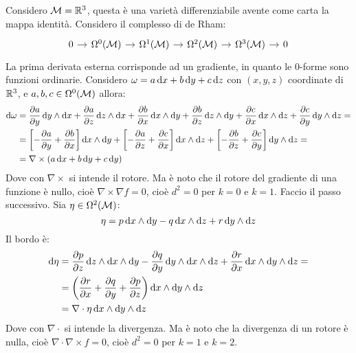 \begin{example}
  Considero $ \mathcal{M} = \mathbb{R}^{3} $, questa è una varietà differenziabile avente come
  carta la mappa identità. Considero il complesso di de Rham:
  \[
    \begin{tikzcd}[nodes = {column sep = 10 pt}]
      0 \rar & \Omega^0(\M) \rar & \Omega^1(\M) \rar & \Omega^2(\M) \rar & \Omega^3(\M) \rar & 0
    \end{tikzcd}
  \]
  La prima derivata esterna corrisponde ad un gradiente, in quanto le
  $ 0 $-forme sono funzioni ordinarie. Considero
  $ \omega = a \operatorname{d}\!{x} + b \operatorname{d}\!{y} + c \operatorname{d}\!{z} $ con $ (x,y,z) $ coordinate di
  $ \mathbb{R}^{3} $, e $ a, b, c \in \Omega^0(\mathcal{M}) $ allora:
  \begin{align*}
    \d \omega & =          \frac{\partial a}{\partial y} \d y \wedge \d x + \frac{\partial a}{\partial z} \d z \wedge \d x + \frac{\partial b}{\partial x} \d x \wedge \d y +
             \frac{\partial b}{\partial z} \d z \wedge \d y + \frac{\partial c}{\partial x} \d x \wedge \d z + \frac{\partial c}{\partial y} \d y \wedge \d z = \\
         & =      \left[ - \frac{\partial a}{\partial y} + \frac{\partial b}{\partial x} \right] \d x \wedge \d y +
                 \left[ - \frac{\partial a}{\partial z} + \frac{\partial c}{\partial x} \right] \d x \wedge \d z +
                 \left[ - \frac{\partial b}{\partial z} + \frac{\partial c}{\partial y} \right] \d y \wedge \d z =                      \\
         & =  \nabla \times (a \d x + b \d y + c \d y)
  \end{align*}
  Dove con $ \nabla \times $ si intende il rotore. Ma è noto che il rotore del gradiente di una funzione è nullo,
  cioè $ \nabla \times \nabla f = 0 $, cioè $ d^2 = 0 $ per $ k = 0 $ e $ k = 1 $.
  Faccio il passo successivo. Sia $ \eta \in \Omega^2(\mathcal{M}) $:
  \[
    \eta = p \operatorname{d}\!{x} \wedge \operatorname{d}\!{y} - q \operatorname{d}\!{x} \wedge \operatorname{d}\!{z} + r \operatorname{d}\!{y} \wedge \operatorname{d}\!{z}
  \]
  Il bordo è:
  \begin{align*}
    \d \eta & = \frac{\partial p}{\partial z} \d z \wedge \d x \wedge \d y - \frac{\partial q}{\partial y} \d y \wedge \d x \wedge \d z + \frac{\partial r}{\partial x} \d x \wedge \d y \wedge \d z = \\
    & = \left( \frac{\partial r}{\partial x} + \frac{\partial q}{\partial y} + \frac{\partial p}{\partial z} \right) \d x \wedge \d y \wedge \d z\\
    & = \nabla \cdot \eta \d x \wedge \d y \wedge \d z
  \end{align*}
  Dove con $ \nabla \cdot $ si intende la divergenza. Ma è noto che la divergenza di un rotore è nulla,
  cioè $ \nabla \cdot \nabla \times f = 0 $, cioè $ d^2 = 0 $ per $ k = 1 $ e $ k = 2 $.
\end{example}
